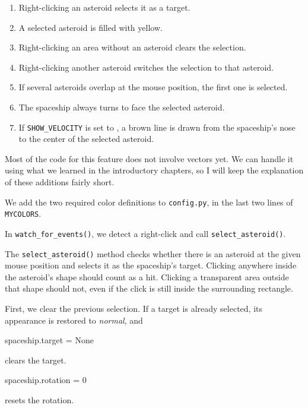 
\begin{enumerate}
	\item Right-clicking an asteroid selects it as a target.
	\item A selected asteroid is filled with yellow.
	\item Right-clicking an area without an asteroid clears the selection.
	\item Right-clicking another asteroid switches the selection to that asteroid.
	\item If several asteroids overlap at the mouse position, the first one is selected.
	\item The spaceship always turns to face the selected asteroid.
	\item If \texttt{SHOW\_VELOCITY} is set to \true, a brown line is drawn from the spaceship's nose to the center of the selected asteroid.
\end{enumerate}
\er

Most of the code for this feature does not involve vectors yet. We can handle it using what we learned in the introductory chapters, so I will keep the explanation of these additions fairly short.

We add the two required color definitions to \texttt{config.py}, in the last two lines of \texttt{MYCOLORS}.


In \texttt{watch\_for\_events()}, we detect a right-click and call \texttt{select\_asteroid()}.


The \texttt{select\_asteroid()} method checks whether there is an asteroid at the given mouse position and selects it as the spaceship's target. Clicking anywhere inside the asteroid's shape should count as a hit. Clicking a transparent area outside that shape should not, even if the click is still inside the surrounding rectangle.

First, we clear the previous selection. If a target is already selected, its appearance is restored to \emph{normal}, and
\begin{codebox}
	spaceship.target = None
\end{codebox}
clears the target.
\begin{codebox}
	spaceship.rotation = 0
\end{codebox}
resets the rotation.

